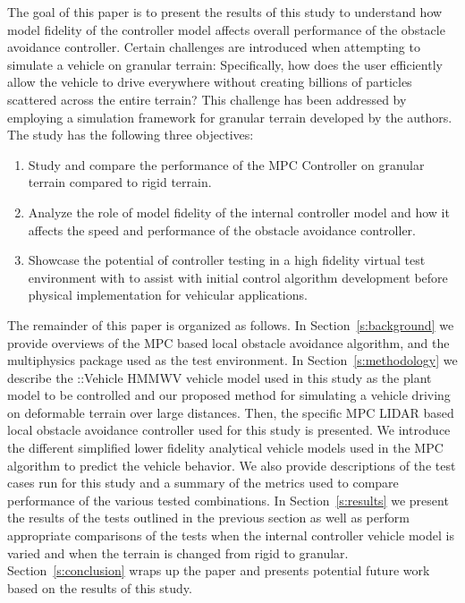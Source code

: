 \documentclass[12pt,twocolumn]{article}
\newcommand{\CHRONO}{{\sffamily{{Chrono}}}}
\newcommand{\ChronoVehicle}{{\sffamily{Chrono}}::Vehicle}
\begin{document}
The goal of this paper is to present the results of this study to understand how model fidelity of the controller model affects overall performance of the obstacle avoidance controller. Certain challenges are introduced when attempting to simulate a vehicle on granular terrain: Specifically, how does the user efficiently allow the vehicle to drive everywhere without creating billions of particles scattered across the entire terrain? This challenge has been addressed by employing a simulation framework for granular terrain developed by the authors. The study has the following three objectives:
\begin{enumerate}
\item
Study and compare the performance of the MPC Controller on granular terrain compared to rigid terrain.
\item
Analyze the role of model fidelity of the internal controller model and how it affects the speed and performance of the obstacle avoidance controller.
\item
Showcase the potential of controller testing in a high fidelity virtual test environment with {\CHRONO} to assist with initial control algorithm development before physical implementation for vehicular applications.
\end{enumerate}

The remainder of this paper is organized as follows.  In Section~\ref{s:background} we provide overviews of the MPC based local obstacle avoidance algorithm, and the {\CHRONO} multiphysics package used as the test environment. In Section~\ref{s:methodology} we describe the {\ChronoVehicle} HMMWV vehicle model used in this study as the plant model to be controlled and our proposed method for simulating a vehicle driving on deformable terrain over large distances. Then, the specific MPC LIDAR based local obstacle avoidance controller used for this study is presented. We introduce the different simplified lower fidelity analytical vehicle models used in the MPC algorithm to predict the {\CHRONO} vehicle behavior. We also provide descriptions of the test cases run for this study and a summary of the metrics used to compare performance of the various tested combinations. In Section~\ref{s:results} we present the results of the tests outlined in the previous section as well as perform appropriate comparisons of the tests when the internal controller vehicle model is varied and when the terrain is changed from rigid to granular. Section~\ref{s:conclusion} wraps up the paper and presents potential future work based on the results of this study.
\end{document}
